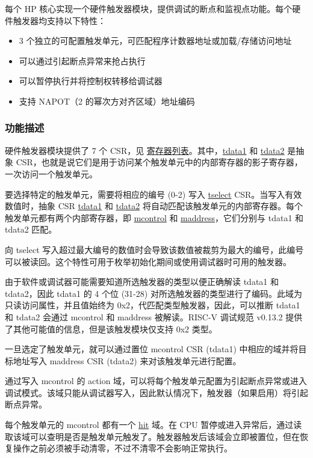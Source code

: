 \documentclass[main\_\_CN.tex]{subfiles}
\begin{document}
每个 HP 核心实现一个硬件触发器模块，提供调试的断点和监视点功能。每个硬件触发器均支持以下特性：

\begin{itemize}
    \item 3 个独立的可配置触发单元，可匹配程序计数器地址或加载/存储访问地址
    \item 可以通过引起断点异常来抢占执行
    \item 可以暂停执行并将控制权转移给调试器
    \item 支持 NAPOT（2 的幂次方对齐区域）地址编码
\end{itemize}

\subsubsection{功能描述}
\label{sec:riscvcpu-hwt-func-descr}

硬件触发器模块提供了 7 个 CSR，见 \hyperref[sec:riscvcpu-hwt-reg-summ]{寄存器列表}。其中，\hyperref[regdesc:TDATA1]{tdata1} 和 \hyperref[regdesc:TDATA2]{tdata2} 是抽象 CSR，也就是说它们是用于访问某个触发单元中的内部寄存器的影子寄存器，一次访问一个触发单元。

要选择特定的触发单元，需要将相应的编号 (0-2) 写入 \hyperref[regdesc:TSELECT]{tselect} CSR。当写入有效数值时，抽象 CSR \hyperref[regdesc:TDATA1]{tdata1} 和 \hyperref[regdesc:TDATA2]{tdata2} 将自动匹配该触发单元的内部寄存器。每个触发单元都有两个内部寄存器，即 \hyperref[regdesc:MCONTROL]{mcontrol} 和 \hyperref[regdesc:MADDRESS]{maddress}，它们分别与 tdata1 和 tdata2 匹配。

向 tselect 写入超过最大编号的数值时会导致该数值被裁剪为最大的编号，此编号可以被读回。这个特性可用于枚举初始化期间或使用调试器时可用的触发器。

由于软件或调试器可能需要知道所选触发器的类型以便正确解读 tdata1 和 tdata2，因此 tdata1 的 4 个位 (31-28) 对所选触发器的类型进行了编码。此域为只读访问属性，并且值始终为 0x2，代匹配类型触发器，因此，可以推断 tdata1 和 tdata2 会通过 mcontrol 和 maddress 被解读。RISC-V 调试规范 v0.13.2 提供了其他可能值的信息，但是该触发模块仅支持 0x2 类型。

一旦选定了触发单元，就可以通过置位 mcontrol CSR (tdata1) 中相应的域并将目标地址写入 maddress CSR (tdata2) 来对该触发单元进行配置。

通过写入 mcontrol 的 action 域，可以将每个触发单元配置为引起断点异常或进入调试模式。该域只能从调试器写入，因此默认情况下，触发器（如果启用）将引起断点异常。

每个触发单元的 mcontrol 都有一个 \hyperref[fielddesc:MCONTROLHIT]{hit} 域。在 CPU 暂停或进入异常后，通过读取该域可以查明是否是触发单元触发了。触发器触发后该域会立即被置位，但在恢复操作之前必须被手动清零，不过不清零不会影响正常执行。
\end{document}
